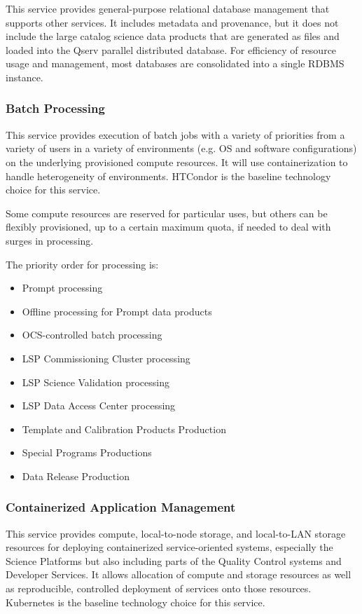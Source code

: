 \documentclass[DM,toc,lsstdraft]{lsstdoc}
\begin{document}
This service provides general-purpose relational database management that supports other services.
It includes metadata and provenance, but it does not include the large catalog science data products that are generated as files and loaded into the Qserv parallel distributed database.
For efficiency of resource usage and management, most databases are consolidated into a single RDBMS instance.

\subsubsection{Batch Processing}\label{batch-processing}

This service provides execution of batch jobs with a variety of priorities from a variety of users in a variety of environments (e.g. OS and software configurations) on the underlying provisioned compute resources.
It will use containerization to handle heterogeneity of environments.
HTCondor is the baseline technology choice for this service.

Some compute resources are reserved for particular uses, but others can
be flexibly provisioned, up to a certain maximum quota, if needed to
deal with surges in processing.

The priority order for processing is:
\begin{itemize}
\item
  Prompt processing
\item
  Offline processing for Prompt data products
\item
  OCS-controlled batch processing
\item
  LSP Commissioning Cluster processing
\item
  LSP Science Validation processing
\item
  LSP Data Access Center processing
\item
  Template and Calibration Products Production
\item
  Special Programs Productions
\item
  Data Release Production
\end{itemize}

\subsubsection{Containerized Application Management}\label{containerized-application-management}

This service provides compute, local-to-node storage, and local-to-LAN storage resources for deploying containerized service-oriented systems, especially the Science Platforms but also including parts of the Quality Control systems and Developer Services.
It allows allocation of compute and storage resources as well as reproducible, controlled deployment of services onto those resources.
Kubernetes is the baseline technology choice for this service.
\end{document}
